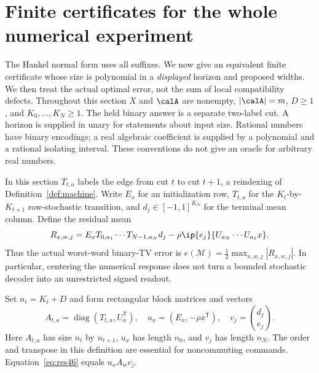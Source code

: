 \section{Finite certificates for the whole numerical experiment}\label{sec:cert46}
The Hankel normal form uses all suffixes. We now give an equivalent
finite certificate whose size is polynomial in a \emph{displayed}
horizon and proposed widths. We then treat the actual optimal error,
not the sum of local compatibility defects. Throughout this section
$X$ and $\calA$ are nonempty, $|\calA|=m$, $D\ge1$, and
$K_0,\ldots,K_N\ge1$. The held binary answer is a separate two-label
cut. A horizon is supplied in unary for statements about input size.
Rational numbers have binary encodings; a real algebraic coefficient
is supplied by a polynomial and a rational isolating interval.
These conventions do not give an oracle for arbitrary real numbers.

In this section $T_{t,a}$ labels the edge from cut $t$ to cut $t+1$,
a reindexing of Definition~\ref{def:machine}. Write $E_x$ for an initialization row, $T_{t,a}$ for the
$K_t$-by-$K_{t+1}$ row-stochastic transition, and $d_j\in[-1,1]^{K_N}$
for the terminal mean column. Define the residual mean
\begin{equation}\label{eq:res46}
 R_{x,w,j}=E_xT_{0,a_1}\cdots T_{N-1,a_N}d_j
             -\rho\ip{e_j}{U_{a_N}\cdots U_{a_1}x}.
\end{equation}
Thus the actual worst-word binary-TV error is
$e(\mathcal M)=\frac12\max_{x,w,j}|R_{x,w,j}|$.
In particular, centering the numerical response does not turn a
bounded stochastic decoder into an unrestricted signed readout.

Set $n_t=K_t+D$ and form rectangular block matrices and vectors
\begin{equation}\label{eq:aug46}
 A_{t,a}=\operatorname{diag}(T_{t,a},U_a^{\mathsf T}),\quad
 u_x=(E_x,-\rho x^{\mathsf T}),\quad
 v_j=\binom{d_j}{e_j}.
\end{equation}
Here $A_{t,a}$ has size $n_t$ by $n_{t+1}$, $u_x$ has length $n_0$,
and $v_j$ has length $n_N$. The order and transpose in this definition are essential for
noncommuting commands. Equation~\eqref{eq:res46} equals $u_xA_wv_j$.

